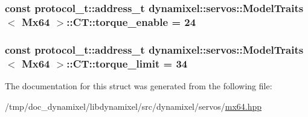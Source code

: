 \subsubsection[{\texorpdfstring{torque\+\_\+enable}{torque_enable}}]{\setlength{\rightskip}{0pt plus 5cm}const {\bf protocol\+\_\+t\+::address\+\_\+t} {\bf dynamixel\+::servos\+::\+Model\+Traits}$<$ {\bf Mx64} $>$\+::C\+T\+::torque\+\_\+enable = 24\hspace{0.3cm}{\ttfamily [static]}}\hypertarget{structdynamixel_1_1servos_1_1_model_traits_3_01_mx64_01_4_1_1_c_t_adfe38fe128203566373b548a40cd7b0c}{}\label{structdynamixel_1_1servos_1_1_model_traits_3_01_mx64_01_4_1_1_c_t_adfe38fe128203566373b548a40cd7b0c}
\subsubsection[{\texorpdfstring{torque\+\_\+limit}{torque_limit}}]{\setlength{\rightskip}{0pt plus 5cm}const {\bf protocol\+\_\+t\+::address\+\_\+t} {\bf dynamixel\+::servos\+::\+Model\+Traits}$<$ {\bf Mx64} $>$\+::C\+T\+::torque\+\_\+limit = 34\hspace{0.3cm}{\ttfamily [static]}}\hypertarget{structdynamixel_1_1servos_1_1_model_traits_3_01_mx64_01_4_1_1_c_t_a72169733dfbb24498f22aa2e2c610933}{}\label{structdynamixel_1_1servos_1_1_model_traits_3_01_mx64_01_4_1_1_c_t_a72169733dfbb24498f22aa2e2c610933}


The documentation for this struct was generated from the following file\+:\begin{DoxyCompactItemize}
\item 
/tmp/doc\+\_\+dynamixel/libdynamixel/src/dynamixel/servos/\hyperlink{mx64_8hpp}{mx64.\+hpp}\end{DoxyCompactItemize}
